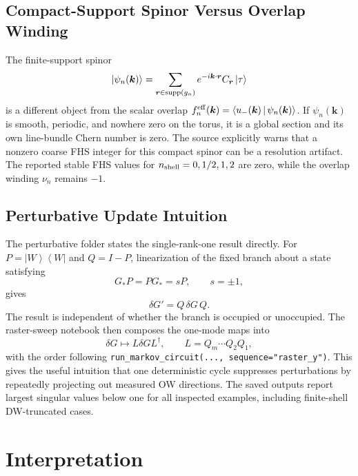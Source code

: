 \documentclass[aps,prb,onecolumn,nofootinbib,superscriptaddress]{revtex4-2}
\newcommand{\ket}[1]{\left|#1\right\rangle}
\newcommand{\bra}[1]{\left\langle#1\right|}
\newcommand{\braket}[2]{\left\langle #1\,\middle|\,#2\right\rangle}
\begin{document}
\subsection{Compact-Support Spinor Versus Overlap Winding}

The finite-support spinor
\begin{equation}
\ket{\psi_n(\bm{k})}
=
\sum_{\bm{r}\in{\rm supp}(g_n)}
e^{-i\bm{k}\cdot\bm{r}}C_{\bm{r}}\ket{\tau}
\end{equation}
is a different object from the scalar overlap $f_n^{\rm eff}(\bm{k})=\braket{u_-(\bm{k})}{\psi_n(\bm{k})}$.  If $\psi_n(\bm{k})$ is smooth, periodic, and nowhere zero on the torus, it is a global section and its own line-bundle Chern number is zero.  The source explicitly warns that a nonzero coarse FHS integer for this compact spinor can be a resolution artifact.  The reported stable FHS values for $n_{\rm shell}=0,1/2,1,2$ are zero, while the overlap winding $\nu_n$ remains $-1$.

\subsection{Perturbative Update Intuition}

The perturbative folder states the single-rank-one result directly.  For $P=\ket{W}\bra{W}$ and $Q=I-P$, linearization of the fixed branch about a state satisfying
\begin{equation}
G_*P=PG_*=sP,\qquad s=\pm1,
\end{equation}
gives
\begin{equation}
\delta G' = Q\,\delta G\,Q.
\end{equation}
The result is independent of whether the branch is occupied or unoccupied.  The raster-sweep notebook then composes the one-mode maps into
\begin{equation}
\delta G\mapsto L\delta G L^\dagger,\qquad
L=Q_m\cdots Q_2Q_1,
\end{equation}
with the order following \texttt{run\_markov\_circuit(..., sequence="raster\_y")}.  This gives the useful intuition that one deterministic cycle suppresses perturbations by repeatedly projecting out measured OW directions.  The saved outputs report largest singular values below one for all inspected examples, including finite-shell DW-truncated cases.

\section{Interpretation}
\end{document}
